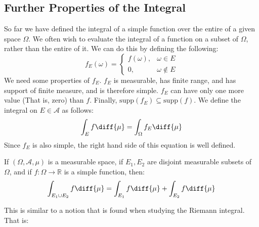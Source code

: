             \subsection{Further Properties of the Integral}
                So far we have defined the integral of a simple
                function over the entire of a given space
                $\Omega$. We often wish to evaluate the integral
                of a function on a subset of $\Omega$, rather
                than the entire of it. We can do this by defining
                the following:
                \begin{equation}
                    f_{E}(\omega)=
                    \begin{cases}
                        f(\omega),&\omega\in{E}\\
                        0,&\omega\notin{E}
                    \end{cases}
                \end{equation}
                We need some properties of $f_{E}$.
                $f_{E}$ is measurable, has finite range, and
                has support of finite measure, and is therefore
                simple. $f_{E}$ can have only one more value
                (That is, zero) than $f$. Finally,
                $\mathrm{supp}(f_{E})\subseteq{\mathrm{supp}(f)}$. We define
                the integral on $E\in\mathcal{A}$ as follows:
                \begin{equation}
                    \int_{E}f\diff{\mu}=
                    \int_{\Omega}f_{E}\diff{\mu}
                \end{equation}
                Since $f_{E}$ is also simple, the right hand
                side of this equation is well defined.
                \begin{theorem}
                    If $(\Omega,\mathcal{A},\mu)$ is a measurable
                    space, if $E_{1},E_{2}$ are disjoint
                    measurable subsets of $\Omega$, and if
                    $f:\Omega\rightarrow\mathbb{R}$ is a simple
                    function, then:
                    \begin{equation}
                        \int_{E_{1}\cup{E}_{2}}f\diff{\mu}=
                        \int_{E_{1}}f\diff{\mu}+
                        \int_{E_{2}}f\diff{\mu}
                    \end{equation}
                \end{theorem}
                This is similar to a notion that is found when
                studying the Riemann integral. That is:
